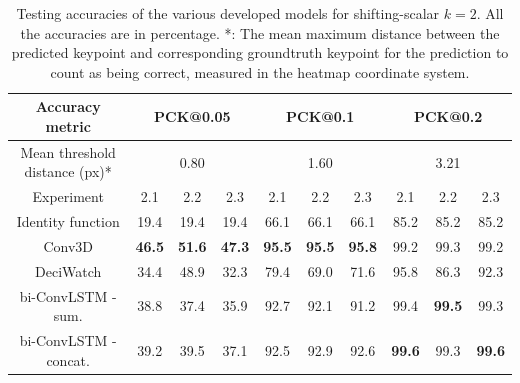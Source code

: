 \documentclass[./main.tex]{subfiles}
\begin{document}
\begin{table}[htbp]
    \begin{tabular}{c||ccc|ccc|ccc}
        \hline
        Accuracy metric & \multicolumn{3}{c}{PCK@0.05} & \multicolumn{3}{c}{PCK@0.1} & \multicolumn{3}{c}{PCK@0.2} \\
        \hline
        Mean threshold distance (px)* & \multicolumn{3}{c}{0.80} & \multicolumn{3}{c}{1.60} & \multicolumn{3}{c}{3.21} \\
        \hline
        Experiment & 2.1 & 2.2 & 2.3 & 2.1 & 2.2 & 2.3 & 2.1 & 2.2 & 2.3 \\
        \hline
        \hline
        Identity function & 19.4 & 19.4 & 19.4 & 66.1 & 66.1 & 66.1 & 85.2 & 85.2 & 85.2 \\
        Conv3D & \textbf{46.5} & \textbf{51.6} & \textbf{47.3} & \textbf{95.5} & \textbf{95.5} & \textbf{95.8} & 99.2 & 99.3 & 99.2 \\
        DeciWatch & 34.4 & 48.9 & 32.3 & 79.4 & 69.0 & 71.6 & 95.8 & 86.3 & 92.3 \\
        bi-ConvLSTM - sum. & 38.8 & 37.4 & 35.9 & 92.7 & 92.1 & 91.2 & 99.4 & \textbf{99.5} & 99.3 \\
        bi-ConvLSTM - concat. & 39.2 & 39.5 & 37.1 & 92.5 & 92.9 & 92.6 & \textbf{99.6} & 99.3 & \textbf{99.6} \\
        \hline
    \end{tabular}
    \caption{Testing accuracies of the various developed models for shifting-scalar $k = 2$. All the accuracies are in percentage. *: The mean maximum distance between the predicted keypoint and corresponding groundtruth keypoint for the prediction to count as being correct, measured in the heatmap coordinate system.}
    \label{tab:finetune_test_accs_2}
\end{table}
\end{document}
